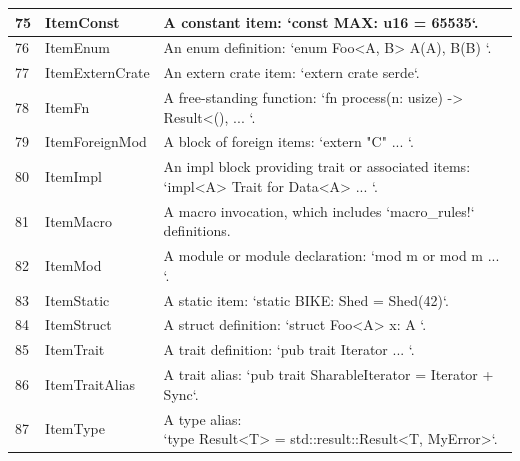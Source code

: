 \begin{longtable}{| p{} | p{} | p{} |}
75    & ItemConst                      & A constant item: `const MAX: u16 = 65535`.                                                                     \\ \hline
76    & ItemEnum                       & An enum definition: `enum Foo<A, B> { A(A), B(B) }`.                                                           \\ \hline
77    & ItemExternCrate                & An extern crate item: `extern crate serde`.                                                                    \\ \hline
78    & ItemFn                         & A free-standing function: `fn process(n: usize) -> Result<(), { ... }`.                                          \\ \hline
79    & ItemForeignMod                 & A block of foreign items: `extern "C" { ... }`.                                                                \\ \hline
80    & ItemImpl                       & \makecell{An impl block providing trait or associated items: \\ `impl<A> Trait for Data<A> { ... }`.}                        \\ \hline
81    & ItemMacro                      & A macro invocation, which includes `macro\_rules!` definitions.                                                 \\ \hline
82    & ItemMod                        & A module or module declaration: `mod m or mod m { ... }`.                                                      \\ \hline
83    & ItemStatic                     & A static item: `static BIKE: Shed = Shed(42)`.                                                                 \\ \hline
84    & ItemStruct                     & A struct definition: `struct Foo<A> { x: A }`.                                                                 \\ \hline
85    & ItemTrait                      & A trait definition: `pub trait Iterator { ... }`.                                                              \\ \hline
86    & ItemTraitAlias                 & A trait alias: `pub trait SharableIterator = Iterator + Sync`.                                                 \\ \hline
87    & ItemType                       & \makecell{A type alias: \\ `type Result<T> = std::result::Result<T, MyError>`.}                                              \\ \hline

\end{longtable}
